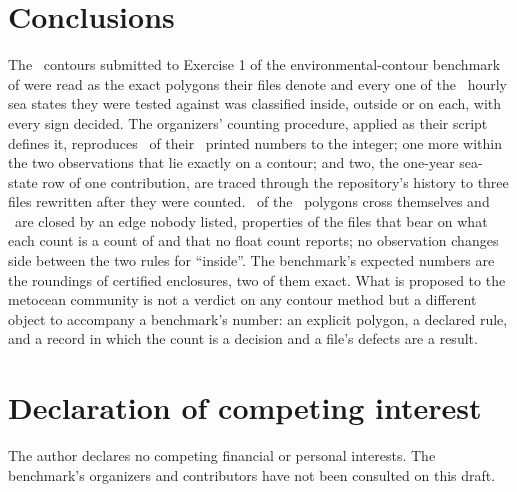 \documentclass[preprint,11pt,authoryear]{elsarticle}
\begin{document}
\section{Conclusions}\label{sec:conclusions}
The \EContours\ contours submitted to Exercise 1 of the environmental-contour benchmark of \citet{haselsteiner2021} were read as the exact polygons their files denote and every one of the \EHoursTotal\ hourly sea states they were tested against was classified inside, outside or on each, with every sign decided. The organizers' counting procedure, applied as their script defines it, reproduces \EExact\ of their \EComparisons\ printed numbers to the integer; one more within the two observations that lie exactly on a contour; and two, the one-year sea-state row of one contribution, are traced through the repository's history to three files rewritten after they were counted. \ENotSimple\ of the \EContours\ polygons cross themselves and \ENotClosed\ are closed by an edge nobody listed, properties of the files that bear on what each count is a count of and that no float count reports; no observation changes side between the two rules for ``inside''. The benchmark's expected numbers are the roundings of certified enclosures, two of them exact. What is proposed to the metocean community is not a verdict on any contour method but a different object to accompany a benchmark's number: an explicit polygon, a declared rule, and a record in which the count is a decision and a file's defects are a result.

\section*{Declaration of competing interest}
The author declares no competing financial or personal interests. The benchmark's organizers and contributors have not been consulted on this draft.
\end{document}
